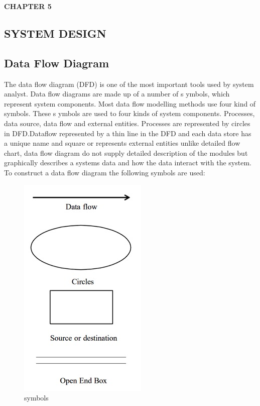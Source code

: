 \documentclass[12pt]{article}
\begin{document}
\newpage
\begin{flushleft}\textbf{CHAPTER 5} \end{flushleft}
\begin{flushleft}\section{SYSTEM DESIGN} \end{flushleft}
\vspace*{10px}

\subsection{Data Flow Diagram}

The data flow diagram (DFD) is one of the most important tools used by system
analyst. Data flow diagrams are made up of a number of s ymbols, which represent
system components. Most data flow modelling methods use four kind of symbols.
These s ymbols are used to four kinds of system components. Processes, data source,
data flow and external entities. 
Processes are represented by circles in DFD.Dataflow represented by a thin
line in the DFD and each data store has a unique name and square or represents
external entities unlike detailed flow chart, data flow diagram do not supply detailed
description of the modules but graphically describes a systems data and how the data
interact with the system.
To construct a data flow diagram the following symbols are used:


\begin{figure}[h!]
\begin{center}
\includegraphics[scale=.8]{DFD}
\caption{symbols}
\end{center}
\end{figure}
\end{document}

